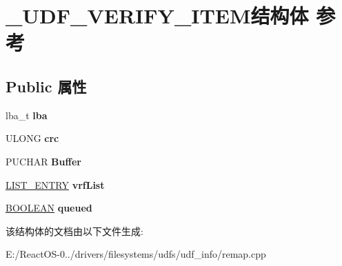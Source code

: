 \hypertarget{struct___u_d_f___v_e_r_i_f_y___i_t_e_m}{}\section{\+\_\+\+U\+D\+F\+\_\+\+V\+E\+R\+I\+F\+Y\+\_\+\+I\+T\+E\+M结构体 参考}
\label{struct___u_d_f___v_e_r_i_f_y___i_t_e_m}
\subsection*{Public 属性}
\begin{DoxyCompactItemize}
\item 
\mbox{\label{struct___u_d_f___v_e_r_i_f_y___i_t_e_m_ae91f812f323347d4de306ea04ee28297}} 
lba\+\_\+t {\bfseries lba}
\item 
\mbox{\label{struct___u_d_f___v_e_r_i_f_y___i_t_e_m_ad9ab51fba03d896be4bf8b7249b40062}} 
U\+L\+O\+NG {\bfseries crc}
\item 
\mbox{\label{struct___u_d_f___v_e_r_i_f_y___i_t_e_m_a10d5e93abfe3567458f62112a98ca1ee}} 
P\+U\+C\+H\+AR {\bfseries Buffer}
\item 
\mbox{\label{struct___u_d_f___v_e_r_i_f_y___i_t_e_m_a74da72f55ae70657459ac24daae4d4de}} 
\hyperlink{struct___l_i_s_t___e_n_t_r_y}{L\+I\+S\+T\+\_\+\+E\+N\+T\+RY} {\bfseries vrf\+List}
\item 
\mbox{\label{struct___u_d_f___v_e_r_i_f_y___i_t_e_m_ad918cf36a722d49f44fa4b4ac630427e}} 
\hyperlink{_processor_bind_8h_a112e3146cb38b6ee95e64d85842e380a}{B\+O\+O\+L\+E\+AN} {\bfseries queued}
\end{DoxyCompactItemize}


该结构体的文档由以下文件生成\+:\begin{DoxyCompactItemize}
\item 
E\+:/\+React\+O\+S-\/0../drivers/filesystems/udfs/udf\+\_\+info/remap.\+cpp\end{DoxyCompactItemize}

